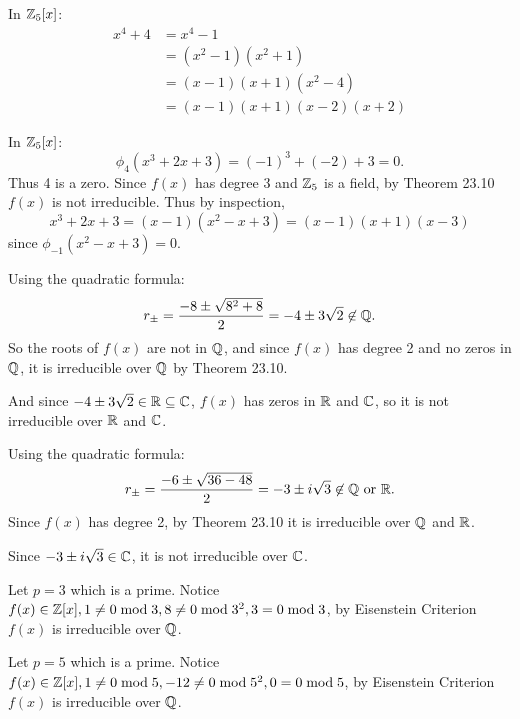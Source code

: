 \documentclass[class=article,crop=false]{standalone}
\begin{document}
\begin{problem}[23.9]
	In $ \mathbb{Z}_5[x]$:
	\begin{align*}
		x^{4}+ 4 &= x^{4} -1 \\
			 &= (x^2-1)(x^2+1) \\
			 &= (x-1)(x+1) (x^2-4)\\
			 &= (x-1)(x+1)(x-2)(x+2) 
	\end{align*}
\end{problem}

\begin{problem}[23.12]
	In $ \mathbb{Z}_5[x]$:
	\[
		\phi_4(x^3+ 2x+3) = (-1)^3 + (-2)+ 3 = 0
	.\] 
	Thus 4 is a zero. Since $ f(x)$ has degree 3 and  $ \mathbb{Z}_5$ is a field, by Theorem 23.10 $ f(x)$ is not irreducible. Thus by inspection,
\[
	x^3+ 2x + 3 = (x-1)(x^2-x + 3) = (x-1)(x+1)(x-3)
\] 
	since  $ \phi_{-1}(x^2 - x +3) =0$. 
\end{problem}

\begin{problem}[23.14]
Using the quadratic formula:
\[
r_{\pm} = \frac{-8 \pm \sqrt{8^2+8} }{2 } = -4 \pm 3\sqrt{2} \not\in \mathbb{Q} 
.\] 
So the roots of $ f(x)$ are not in  $ \mathbb{Q}$, and since $ f(x)$ has degree 2 and no zeros in  $ \mathbb{Q}$, it is irreducible over $ \mathbb{Q}$ by Theorem 23.10.

And since $ -4 \pm 3\sqrt{2} \in \mathbb{R} \subseteq \mathbb{C} $, $ f(x)$ has zeros in  $ \mathbb{R}$ and $ \mathbb{C}$, so it is not irreducible over $ \mathbb{R}$ and $ \mathbb{C}$.
\end{problem}

\begin{problem}[23.15]
Using the quadratic formula:
\[
r_{\pm} = \frac{-6 \pm \sqrt{36 - 48} }{2 } = -3 \pm i \sqrt{3} \not\in \mathbb{Q} \text{ or } \mathbb{R} 
.\] 
Since $ f(x)$ has degree 2, by Theorem 23.10 it is irreducible over $ \mathbb{Q}$ and $ \mathbb{R}$.

Since $ -3 \pm i \sqrt{3} \in \mathbb{C}$, it is not irreducible over $ \mathbb{C}$.
\end{problem}

\begin{problem}[23.16]
	Let $ p=3$ which is a prime. Notice  $ f(x) \in \mathbb{Z}[x], 1 \neq 0 \bmod 3, 8 \neq 0 \bmod 3^2, 3=0 \bmod 3$, by Eisenstein Criterion $ f(x)$ is irreducible over  $ \mathbb{Q}$.
\end{problem}
\begin{problem}[23.18]
	Let $ p=5$ which is a prime. Notice $ f(x) \in \mathbb{Z}[x], 1 \neq 0 \bmod 5, -12 \neq 0 \bmod 5^2, 0 = 0 \bmod 5$, by Eisenstein Criterion $ f(x)$ is irreducible over  $ \mathbb{Q}$. 
\end{problem}
\end{document}
